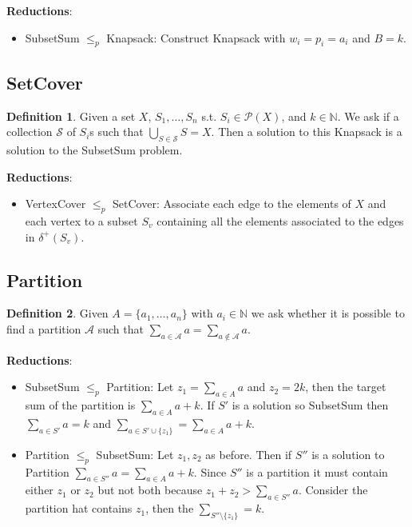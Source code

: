 \documentclass[8pt]{extarticle}
\newcommand{\N}{\mathbb{N}}
\theoremstyle{definition}
\newtheorem{definition}{Definition}[section]
\theoremstyle{remark}
\numberwithin{equation}{section}
\newcommand{\reducesto}{\leq_p}
\begin{document}
\begin{landscape}
\begin{multicols}{3}
        \textbf{Reductions}:
        \begin{itemize}
            \item SubsetSum $\reducesto$ Knapsack: Construct Knapsack with $w_i = p_i = a_i$ and $B = k$.
        \end{itemize}


        \subsection{SetCover}
        \begin{definition}
            Given a set $X$, $S_1, \dots, S_n$ s.t. $S_i \in \mathcal P(X)$, and $k \in \N$. We ask if a collection $\mathcal S$ of $S_i$s such that $\bigcup_{S \in \mathcal S} S = X$. Then a solution to this Knapsack is a solution to the SubsetSum problem.
        \end{definition}

        \textbf{Reductions}:
        \begin{itemize}
            \item VertexCover $\reducesto$ SetCover: Associate each edge to the elements of $X$ and each vertex to a subset $S_v$ containing all the elements associated to the edges in $\delta^+(S_v)$.
        \end{itemize}

        \subsection{Partition}
        \begin{definition}
            Given $A = \{a_1, \ldots, a_n\}$ with $a_i \in \N$ we ask whether it is possible to find a partition $\mathcal A$ such that $\sum_{a \in \mathcal A} a = \sum_{a \notin \mathcal A} a$.
        \end{definition}

        \textbf{Reductions}:
        \begin{itemize}
            \item SubsetSum $\reducesto$ Partition: Let $z_1 = \sum_{a \in A} a$ and $z_2 = 2k$, then the target sum of the partition is $\sum_{a \in A} a + k$.
                  If $S'$ is a solution so SubsetSum then $\sum_{a \in S'} a = k$ and $\sum_{a \in S' \cup \{z_1\}} = \sum_{a \in A} a + k$.
            \item Partition $\reducesto$ SubsetSum: Let $z_1, z_2$ as before. Then if $S''$ is a solution to Partition $\sum_{a \in S''} a = \sum_{a \in A} a + k$.
                  Since $S''$ is a partition it must contain either $z_1$ or $z_2$ but not both because $z_1 + z_2 > \sum_{a \in S''} a$.
                  Consider the partition hat contains $z_1$, then the $\sum_{S'' \setminus \{z_1\}} = k$.
        \end{itemize}

    \end{multicols}
\end{landscape}
\end{document}
